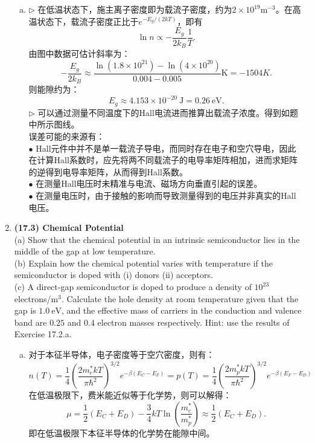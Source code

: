 \documentclass[reqno,a4paper,12pt]{amsart}
\begin{document}
\begin{enumerate}[1.]
\begin{tcolorbox}[breakable, colback = black!5!white, colframe = black]
\begin{enumerate}[(a)]
\item $\triangleright$ 在低温状态下，施主离子密度即为载流子密度，约为$2\times 10^{19} \text{m}^{-3}$。在高温状态下，载流子密度正比于$e^{-E_g/(2kT)}$，即有
\[
	\ln n \propto -\frac{E_g}{2k_B} \frac{1}{T}.
\]
由图中数据可估计斜率为：
\[
	-\frac{E_g}{2k_B} \approx \frac{\ln(1.8\times 10^{21}) - \ln(4\times 10^{20})}{0.004-0.005} \text{K} = -1504K.
\]
则能隙约为：
\[
	E_g \approx 4.153\times 10^{-20} ~ \text{J} = 0.26 ~ \text{eV}.
\]
$\triangleright$ 可以通过测量不同温度下的Hall电流进而推算出载流子浓度。得到如题中所示图线。 \\
误差可能的来源有： \\
$\bullet$ Hall元件中并不是单一载流子导电，而同时存在电子和空穴导电，因此在计算Hall系数时，应先将两不同载流子的电导率矩阵相加，进而求矩阵的逆得到电导率矩阵，从而得到Hall系数。 \\
$\bullet$ 在测量Hall电压时未精准与电流、磁场方向垂直引起的误差。 \\
$\bullet$ 在测量电压时，由于接触的影响而导致测量得到的电压并非真实的Hall电压。 

\end{enumerate}
\end{tcolorbox}

\item \textbf{(17.3) Chemical Potential} \\
(a) Show that the chemical potential in an intrinsic semiconductor lies in the middle of the gap at low temperature. \\
(b) Explain how the chemical potential varies with temperature if the semiconductor is doped with (i) donors (ii) acceptors. \\
(c) A direct-gap semiconductor is doped to produce a density of $10^{23}$ electrons/$\text{m}^3$. Calculate the hole density at room temperature given that the gap is $1.0~\text{eV}$, and the effective mass of carriers in the conduction and valence band are $0.25$ and $0.4$ electron masses respectively. Hint: use the results of Exercise 17.2.a.
\begin{tcolorbox}[breakable, colframe = black, colback = black!5!white]
\begin{enumerate}[(a)]
\item 对于本征半导体，电子密度等于空穴密度，则有：
\[
	n(T) = \frac{1}{4}\left( \frac{2m_e^*kT}{\pi\hbar^2} \right)^{3/2}e^{-\beta(E_C-E_F)} = p(T) = \frac{1}{4}\left( \frac{2m_p^*kT}{\pi\hbar^2} \right)^{3/2}e^{-\beta(E_F-E_D)}
\]
在低温极限下，费米能近似等于化学势，则可以解得：
\[
	\mu = \frac{1}{2}(E_C+E_D) - \frac{3}{4}kT\ln\left( \frac{m_e^*}{m_p^*} \right) \approx \frac{1}{2}(E_C+E_D).
\]
即在低温极限下本征半导体的化学势在能隙中间。


\end{enumerate}
\end{tcolorbox}
\end{enumerate}
\end{document}
